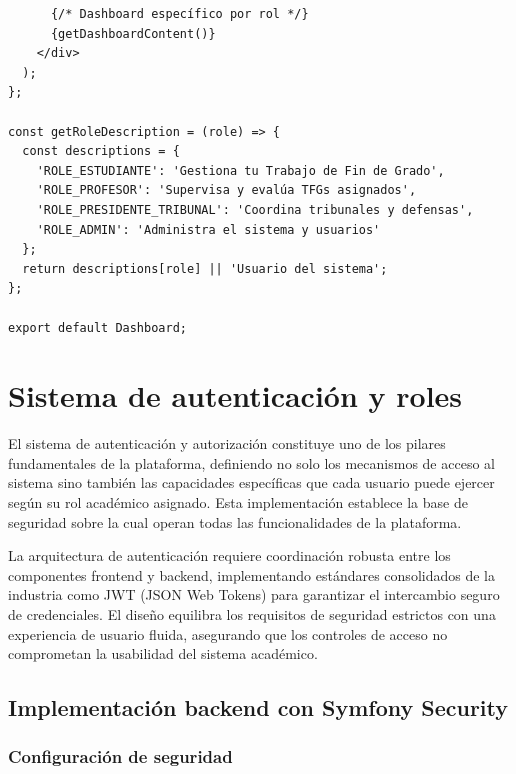 \documentclass[12pt,a4paper,oneside]{report}
\begin{document}
\begin{lstlisting}
      {/* Dashboard específico por rol */}
      {getDashboardContent()}
    </div>
  );
};

const getRoleDescription = (role) => {
  const descriptions = {
    'ROLE_ESTUDIANTE': 'Gestiona tu Trabajo de Fin de Grado',
    'ROLE_PROFESOR': 'Supervisa y evalúa TFGs asignados',
    'ROLE_PRESIDENTE_TRIBUNAL': 'Coordina tribunales y defensas',
    'ROLE_ADMIN': 'Administra el sistema y usuarios'
  };
  return descriptions[role] || 'Usuario del sistema';
};

export default Dashboard;
\end{lstlisting}

\section{Sistema de autenticación y
roles}\label{sistema-de-autenticaciuxf3n-y-roles}

El sistema de autenticación y autorización constituye uno de los pilares fundamentales de la plataforma, definiendo no solo los mecanismos de acceso al sistema sino también las capacidades específicas que cada usuario puede ejercer según su rol académico asignado. Esta implementación establece la base de seguridad sobre la cual operan todas las funcionalidades de la plataforma.

La arquitectura de autenticación requiere coordinación robusta entre los componentes frontend y backend, implementando estándares consolidados de la industria como JWT (JSON Web Tokens) para garantizar el intercambio seguro de credenciales. El diseño equilibra los requisitos de seguridad estrictos con una experiencia de usuario fluida, asegurando que los controles de acceso no comprometan la usabilidad del sistema académico.

\subsection{Implementación backend con Symfony
Security}\label{implementaciuxf3n-backend-con-symfony-security}

\subsubsection{Configuración de
seguridad}\label{configuraciuxf3n-de-seguridad}
\end{document}
